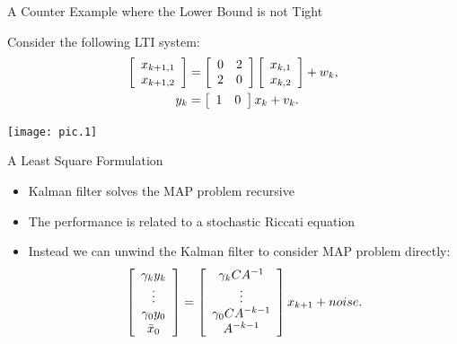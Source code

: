 \documentclass[10pt]{beamer}
\DeclareMathOperator{\1}{\textbf{1}}
\begin{document}
\begin{frame}{A Counter Example where the Lower Bound is not Tight}

  Consider the following LTI system:
  \begin{displaymath}
    \begin{split}
      \left[ {\begin{array}{*{20}c}
	    x_{k+1,1}  \\
	    x_{k+1,2}
	  \end{array}
      }\right] &=
      \left[ {
	  \begin{array}{*{20}c}
	    0 & 2  \\
	    2 & 0 
	  \end{array}
	} \right]  \left[
	{\begin{array}{*{20}c}
	    x_{k,1}  \\
	    x_{k,2}
	  \end{array}
      } \right] + w_k,\\
y_k &= \left[
  {\begin{array}{*{20}c}
      1 & 0 
    \end{array}
} \right] x_k + v_k.
	  \end{split}
	\end{displaymath}
	\begin{center}
	  \texttt{[image: pic.1]}
	\end{center}
      \end{frame}

      \begin{frame}{A Least Square Formulation}
	\begin{itemize}
	  \item  Kalman filter solves the MAP problem recursive
	  \item The performance is related to a stochastic Riccati equation
	  \item Instead we can unwind the Kalman filter to consider MAP problem directly:
	    \begin{displaymath}
	      \left[ {\begin{array}{*{20}c}
		    {\gamma_k y_k } \\
		    \vdots \\                                                           {\gamma_0y_0 } \\
		    \bar x_0 \\
		    \end{array}} \right] = \left[ {\begin{array}{*{20}c}                  
		    {\gamma_k CA^{ - 1} } \\
		    \vdots \\
		    {\gamma_{0}CA^{ - k-1} } \\
		    {A^{ - k - 1} } \\
	      \end{array}} \right]x_{k + 1} + noise.
	    \end{displaymath} 
	\end{itemize}
      \end{frame}
\end{document}
